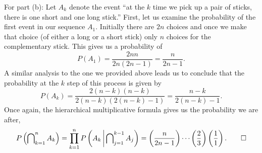 \begin{solution*}
  For part (b): Let \(A_k\) denote the event ``at the \(k\)
  time we pick up a pair of sticks, there is one short and one long
  stick.'' First, let us examine the probability of the first event in our
  sequence \(A_1\). Initially there are \(2n\) choices and once we make
  that choice (of either a long or a short stick) only \(n\) choices for
  the complementary stick. This gives us a probability of
  \[
    P(A_1)=\frac{2nn}{2n(2n-1)}=\frac{n}{2n-1}.
  \]
  A similar analysis to the one we provided above leads us to conclude that
  the probability at the \(k\) step of this process is given by
  \[
    P(A_k)=\frac{2(n-k)(n-k)}{2(n-k)(2(n-k)-1)}=\frac{n-k}{2(n-k)-1}.
  \]
  Once again, the hierarchical multiplicative formula gives us the
  probability we are after,
  \[
    P\left(\bigcap\nolimits_{k=1}^n A_k\right)=%
    \prod_{k=1}^n
    P\left(A_k\,\middle|\,\bigcap\nolimits_{j=1}^{k-1}A_j\right)=%
    \left(\frac{n}{2n-1}\right)\dotsm
    \left(\frac{2}{3}\right)\left(\frac{1}{1}\right).\qedhere
  \]
\end{solution*}

